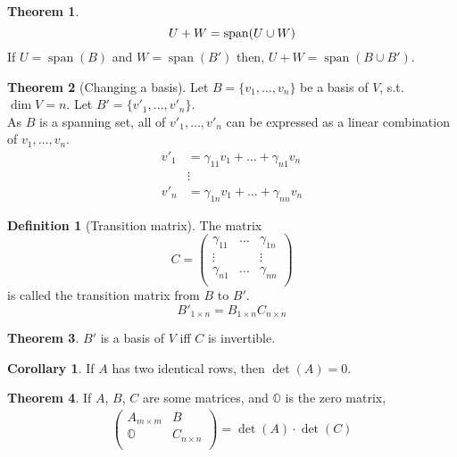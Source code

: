 \documentclass[fleqn, a5paper, 10pt]{amsart}
\DeclareMathOperator{\vspan}{\mathrm{span}} %
\theoremstyle{definition}
\newtheorem{definition}{Definition} %
\theoremstyle{theorem}
\newtheorem{theorem}{Theorem} %
\newtheorem{corollary}{Corollary}
\theoremstyle{remark}
\numberwithin{corollary}{theorem}
\numberwithin{equation}{theorem}
\begin{document}
\begin{theorem}
	\begin{equation*}
		U + W = \vspan (U \cup W)\\
	\end{equation*}
	If $U = \vspan (B)$ and $W = \vspan (B')$
	then, $U + W = \vspan (B \cup B')$.
\end{theorem}

\begin{theorem}[Changing a basis]
	Let $B = \{v_1, \dots, v_n\}$ be a basis of $V$, s.t. $\dim V = n$. Let $B' = \{v'_1, \dots, v'_n\}$.\\
	As $B$ is a spanning set, all of $v'_1, \dots, v'_n$ can be expressed as a linear combination of $v_1, \dots, v_n$.
	\begin{align*}
		v'_1 &= \gamma_{11} v_1 + \dots + \gamma_{n1} v_n\\
		&\vdots\\
		v'_n &= \gamma_{1n} v_1 + \dots + \gamma_{nn} v_n
	\end{align*}
\end{theorem}

\begin{definition}[Transition matrix]
	The matrix
	\begin{equation*}
		C = 
		\begin{pmatrix}
			\gamma_{11} & \dots &\gamma _{1n}\\
			\vdots & &\vdots\\
			\gamma_{n1} & \dots &\gamma_{nn}\\
		\end{pmatrix}
	\end{equation*}
	is called the transition matrix from $B$ to $B'$.
	\begin{equation*}
		B'_{1 \times n} = B_{1 \times n} C_{n \times n}
	\end{equation*}
\end{definition}

\begin{theorem}
	$B'$ is a basis of $V$ iff $C$ is invertible.
\end{theorem}

\begin{corollary}
	If $A$ has two identical rows, then $\det (A) = 0$.
\end{corollary}

\begin{theorem}
	If $A$, $B$, $C$ are some matrices, and $\mathbb{O}$ is the zero matrix,
	\begin{align*}
		\begin{pmatrix}
			A_{m \times m} & B\\
			\mathbb{O} & C_{n \times n}\\
		\end{pmatrix}
		=
		\det (A) \cdot \det (C)
	\end{align*}
\end{theorem}
\end{document}
